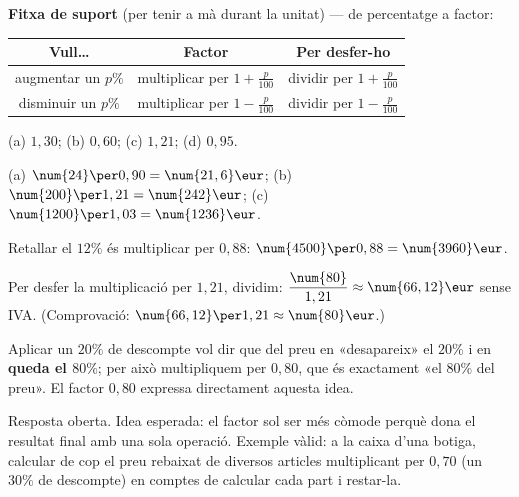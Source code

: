 \begin{idea}
\textbf{Fitxa de suport} (per tenir a mà durant la unitat) — de percentatge a factor:
\begin{center}
\renewcommand{\arraystretch}{1.3}
\begin{tabular}{c c c}
\toprule
\textbf{Vull\dots} & \textbf{Factor} & \textbf{Per desfer-ho} \\
\midrule
augmentar un $p\%$ & multiplicar per $1+\frac{p}{100}$ & dividir per $1+\frac{p}{100}$ \\
disminuir un $p\%$ & multiplicar per $1-\frac{p}{100}$ & dividir per $1-\frac{p}{100}$ \\
\bottomrule
\end{tabular}
\end{center}
\end{idea}

\begin{solucions}
\begin{sollist}
  \item (a) $1,30$; \quad (b) $0,60$; \quad (c) $1,21$; \quad (d) $0,95$.
  \item (a) $\num{24}\per 0,90=\num{21,6}\eur$; \quad
        (b) $\num{200}\per 1,21=\num{242}\eur$; \quad
        (c) $\num{1200}\per 1,03=\num{1236}\eur$.
  \item Retallar el $12\%$ és multiplicar per $0,88$:
        $\num{4500}\per 0,88=\num{3960}\eur$.
  \item Per desfer la multiplicació per $1,21$, dividim:
        $\dfrac{\num{80}}{1,21}\approx \num{66,12}\eur$ sense IVA. (Comprovació:
        $\num{66,12}\per 1,21\approx \num{80}\eur$.)
  \item Aplicar un $20\%$ de descompte vol dir que del preu en «desapareix» el $20\%$ i
        en \textbf{queda el $80\%$}; per això multipliquem per $0,80$, que és
        exactament «el $80\%$ del preu». El factor $0,80$ expressa directament aquesta
        idea.
  \item Resposta oberta. Idea esperada: el factor sol ser més còmode perquè dona el
        resultat final amb una sola operació. Exemple vàlid: a la caixa d'una botiga,
        calcular de cop el preu rebaixat de diversos articles multiplicant per $0,70$
        (un $30\%$ de descompte) en comptes de calcular cada part i restar-la.
\end{sollist}
\end{solucions}
